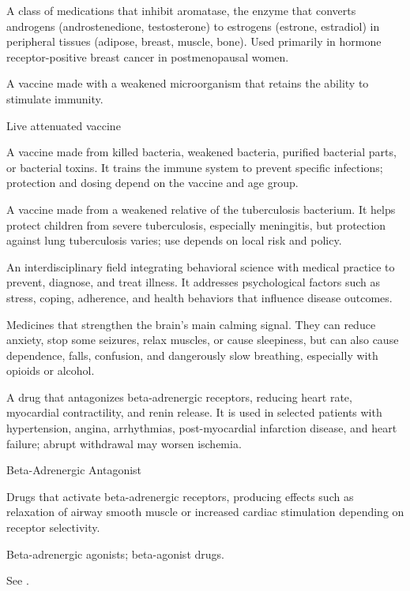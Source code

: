  A class of medications that inhibit aromatase, the enzyme that converts androgens
(androstenedione, testosterone) to estrogens (estrone, estradiol) in peripheral tissues
(adipose, breast, muscle, bone). Used primarily in hormone receptor-positive breast
cancer in postmenopausal women.

 A vaccine made with a weakened microorganism that retains the ability to stimulate immunity.

\synonyms
Live attenuated vaccine

 A vaccine made from killed bacteria, weakened bacteria, purified bacterial parts, or bacterial toxins. It trains the immune system to prevent specific infections; protection and dosing depend on the vaccine and age group.

 A vaccine made from a weakened relative of the tuberculosis bacterium. It helps protect children from severe tuberculosis, especially meningitis, but protection against lung tuberculosis varies; use depends on local risk and policy.

 An interdisciplinary field integrating behavioral science with medical practice to prevent, diagnose, and treat illness. It addresses psychological factors such as stress, coping, adherence, and health behaviors that influence disease outcomes.

 Medicines that strengthen the brain’s main calming signal. They can reduce anxiety, stop some seizures, relax muscles, or cause sleepiness, but can also cause dependence, falls, confusion, and dangerously slow breathing, especially with opioids or alcohol.


 A drug that antagonizes beta-adrenergic receptors, reducing heart rate, myocardial
contractility, and renin release. It is used in selected patients with hypertension,
angina, arrhythmias, post-myocardial infarction disease, and heart failure; abrupt
withdrawal may worsen ischemia.

\synonyms
Beta-Adrenergic Antagonist

 Drugs that activate beta-adrenergic receptors, producing effects such as relaxation of airway smooth muscle or increased cardiac stimulation depending on receptor selectivity.

\synonyms
Beta-adrenergic agonists; beta-agonist drugs.

 See .

